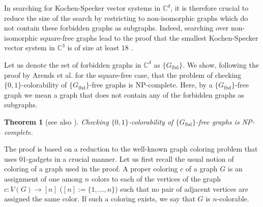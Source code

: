 \documentclass[twocolumn, a4paper, superscriptaddress,nofootinbib, accepted=2020-08-07, hyperref]{quantumarticle}
\def\tred{\textcolor{red}}
\newtheorem{theorem}{Theorem}
\begin{document}
In searching for Kochen-Specker vector systems in $\mathbb{C}^d$, it is therefore crucial to reduce the size of the search by restricting to non-isomorphic graphs which do not contain these forbidden graphs as subgraphs. Indeed, searching over non-isomorphic square-free graphs lead to the proof that the smallest Kochen-Specker vector system in $\mathbb{C}^3$ is of size at least $18$ \cite{Arends09}. 

	
Let us denote the set of forbidden graphs in $\mathbb{C}^d$ as $\{G_{\text{fbd}}\}$. We show, following the proof by Arends et al. \cite{Arends09, AOW11} for the square-free case, that the problem of checking $\{0,1\}$-colorability of $\{G_{\text{fbd}}\}$-free graphs is NP-complete. Here, by a $\{G_{\text{fbd}}\}$-free graph we mean a graph that does not contain any of the forbidden graphs as subgraphs. %
\begin{theorem}[see also \cite{Arends09}]\label{theo:NP}
	Checking $\{0,1\}$-colorability of $\{G_{\text{fbd}}\}$-free graphs is NP-complete. 
\end{theorem}
The proof is based on a reduction to the well-known graph coloring problem that uses $01$-gadgets in a crucial manner. Let us first recall the usual notion of coloring of a graph used in the proof. A proper coloring $c$ of a graph $G$ is an assignment of one among $n$ colors to each of the vertices of the graph $c : V(G) \rightarrow [n]$ ($[n]:=\{1,\dots,n\}$) such that no pair of adjacent vertices are assigned the same color. If such a coloring exists, we say that $G$ is $n$-colorable.
\end{document}
